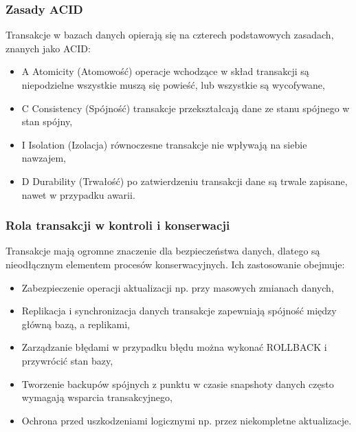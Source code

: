 \documentclass[letterpaper,10pt,polish]{sphinxmanual}
\begin{document}
\subsubsection{Zasady ACID}
\label{\detokenize{rozdzial2/Kontrola_i_konserwacja/kontrola_i_konserwacja:zasady-acid}}
\sphinxAtStartPar
Transakcje w bazach danych opierają się na czterech podstawowych zasadach, znanych jako ACID:
\begin{itemize}
\item {} 
\sphinxAtStartPar
A \sphinxhyphen{} Atomicity (Atomowość) \sphinxhyphen{} operacje wchodzące w skład transakcji są niepodzielne \sphinxhyphen{} wszystkie muszą się powieść, lub wszystkie są wycofywane,

\item {} 
\sphinxAtStartPar
C \sphinxhyphen{} Consistency (Spójność) \sphinxhyphen{} transakcje przekształcają dane ze stanu spójnego w stan spójny,

\item {} 
\sphinxAtStartPar
I \sphinxhyphen{} Isolation (Izolacja) \sphinxhyphen{} równoczesne transakcje nie wpływają na siebie nawzajem,

\item {} 
\sphinxAtStartPar
D \sphinxhyphen{} Durability (Trwałość) \sphinxhyphen{} po zatwierdzeniu transakcji dane są trwale zapisane, nawet w przypadku awarii.

\end{itemize}


\subsubsection{Rola transakcji w kontroli i konserwacji}
\label{\detokenize{rozdzial2/Kontrola_i_konserwacja/kontrola_i_konserwacja:rola-transakcji-w-kontroli-i-konserwacji}}
\sphinxAtStartPar
Transakcje mają ogromne znaczenie dla bezpieczeństwa danych, dlatego są nieodłącznym elementem procesów konserwacyjnych. Ich zastosowanie obejmuje:
\begin{itemize}
\item {} 
\sphinxAtStartPar
Zabezpieczenie operacji aktualizacji \sphinxhyphen{} np. przy masowych zmianach danych,

\item {} 
\sphinxAtStartPar
Replikacja i synchronizacja danych \sphinxhyphen{} transakcje zapewniają spójność między główną bazą, a replikami,

\item {} 
\sphinxAtStartPar
Zarządzanie błędami \sphinxhyphen{} w przypadku błędu można wykonać ROLLBACK i przywrócić stan bazy,

\item {} 
\sphinxAtStartPar
Tworzenie backupów spójnych z punktu w czasie \sphinxhyphen{} snapshoty danych często wymagają wsparcia transakcyjnego,

\item {} 
\sphinxAtStartPar
Ochrona przed uszkodzeniami logicznymi \sphinxhyphen{} np. przez niekompletne aktualizacje.

\end{itemize}
\end{document}
